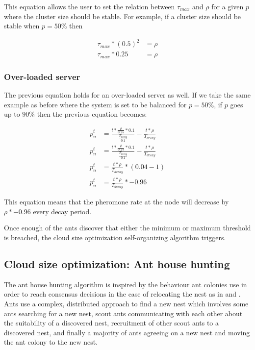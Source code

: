 \documentclass[conference]{IEEEtran}
\begin{document}
This equation allows the user to set the relation between $\tau_{max}$ and $\rho$ for a given $p$ where the cluster size should be stable. For example, if a cluster size should be stable when $p = 50\%$ then

\begin{equation}
\begin{aligned}
\tau_{max} * (0.5)^2 &= \rho \\
\tau_{max} * 0.25 &= \rho
\end{aligned}
\end{equation}

\subsubsection{Over-loaded server}

The previous equation holds for an over-loaded server as well. If we take the same example as before where the system is set to be balanced for $p = 50\%$, if $p$ goes up to $90\%$ then the previous equation becomes:

\begin{equation}
\begin{aligned}
p^{t}_{n} &= \frac{t *  \frac{\rho}{0.25} * 0.1}{\frac{T_{decay}}{0.1}} - \frac{t *  \rho}{T_{decay}} \\
p^{t}_{n} &= \frac{t *  \frac{\rho}{0.25} * 0.1}{\frac{T_{decay}}{0.1}} - \frac{t *  \rho}{T_{decay}} \\
p^{t}_{n} &= \frac{t * \rho}{T_{decay}} * (0.04 - 1) \\
p^{t}_{n} &= \frac{t * \rho}{T_{decay}} * -0.96
\end{aligned}
\end{equation}

This equation means that the pheromone rate at the node will decrease by $\rho * -0.96$ every decay period.

Once enough of the ants discover that either the minimum or maximum threshold is breached, the cloud size optimization self-organizing algorithm triggers.

\subsection{Cloud size optimization: Ant house hunting}

The ant house hunting algorithm is inspired by the behaviour ant colonies use in order to reach consensus decisions in the case of relocating the nest as in \cite{selforg:antreloc} and \cite{selforg:antreloc2}. Ants use a complex, distributed approach to find a new nest which involves some ants searching for a new nest, scout ants communicating with each other about the suitability of a discovered nest, recruitment of other scout ants to a discovered nest, and finally a majority of ants agreeing on a new nest and moving the ant colony to the new nest.
\end{document}
